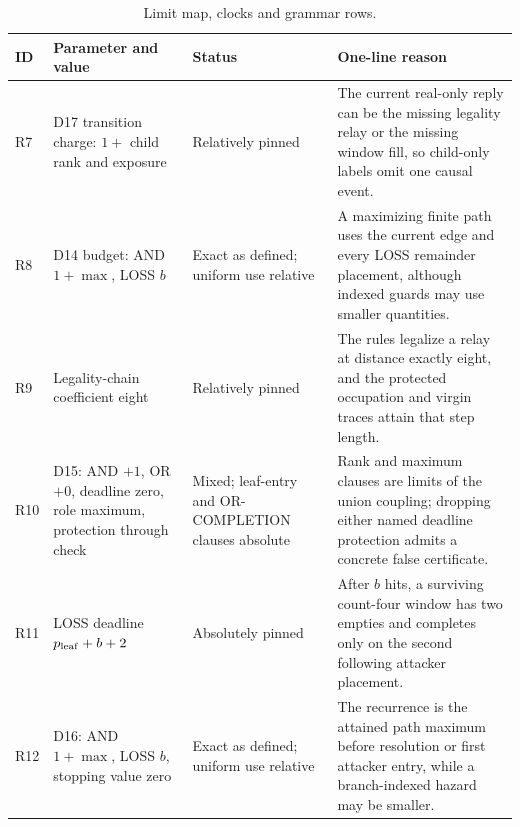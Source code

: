 \begin{table}[p]
  \centering
  \caption{Limit map, clocks and grammar rows.}
  \label{tab:tightness-clocks}
  \scriptsize
  \renewcommand{\arraystretch}{1.12}
  \begin{tabular}{@{}p{}p{}p{}p{}@{}}
    \toprule
    ID & Parameter and value & Status & One-line reason \\
    \midrule
    R7 & D17 transition charge: $1+$ child rank and exposure & Relatively
      pinned &
      The current real-only reply can be the missing legality relay or the
      missing window fill, so child-only labels omit one causal event. \\
    R8 & D14 budget: AND $1+\max$, LOSS $b$ & Exact as defined; uniform use
      relative &
      A maximizing finite path uses the current edge and every LOSS remainder
      placement, although indexed guards may use smaller quantities. \\
    R9 & Legality-chain coefficient eight & Relatively pinned &
      The rules legalize a relay at distance exactly eight, and the protected
      occupation and virgin traces attain that step length. \\
    R10 & D15: AND $+1$, OR $+0$, deadline zero, role maximum, protection
      through check & Mixed; leaf-entry and OR-COMPLETION clauses absolute &
      Rank and maximum clauses are limits of the union coupling; dropping
      either named deadline protection admits a concrete false certificate. \\
    R11 & LOSS deadline $p_{\rm leaf}+b+2$ & Absolutely pinned &
      After $b$ hits, a surviving count-four window has two empties and
      completes only on the second following attacker placement. \\
    R12 & D16: AND $1+\max$, LOSS $b$, stopping value zero & Exact as defined;
      uniform use relative &
      The recurrence is the attained path maximum before resolution or first
      attacker entry, while a branch-indexed hazard may be smaller. \\
    \bottomrule
  \end{tabular}
\end{table}

